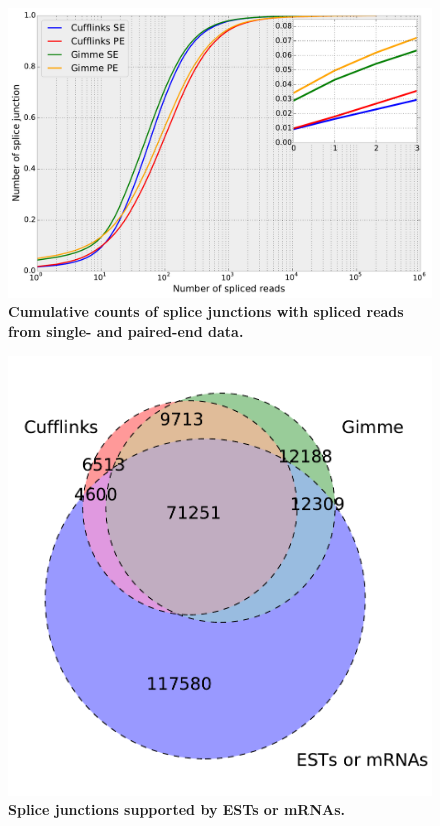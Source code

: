 \documentclass[10pt]{article}
\begin{document}
\begin{figure}[!ht]
\begin{center}
\includegraphics[width=5in]{cdf_splice.pdf}
\end{center}
\caption{
{\bf Cumulative counts of splice junctions with spliced reads from single- and
paired-end data.}
}
\label{cdf_splice}
\end{figure}

\begin{figure}[!ht]
\begin{center}
\includegraphics[width=5in]{chick_est_venn.pdf}
\end{center}
\caption{
    {\bf Splice junctions supported by ESTs or mRNAs.}
}
\label{chick_est_venn}
\end{figure}
\end{document}
